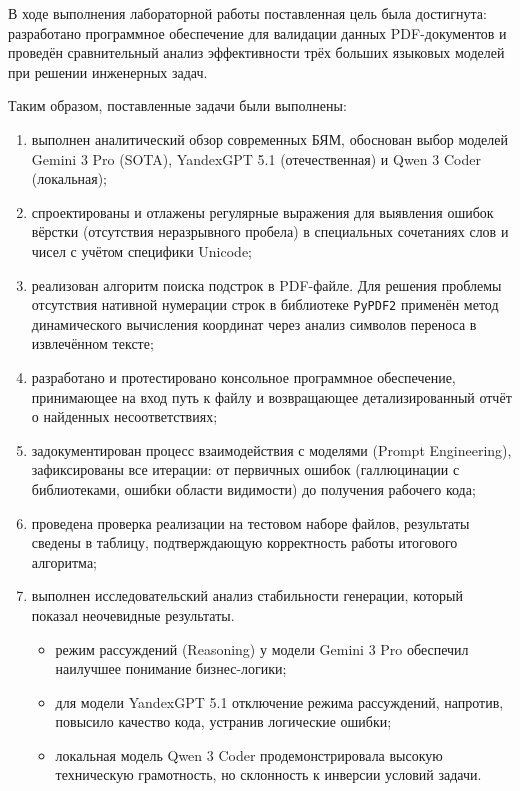 

В ходе выполнения лабораторной работы поставленная цель была достигнута: 
разработано программное обеспечение для валидации данных PDF-документов и проведён сравнительный анализ эффективности трёх больших языковых моделей при решении инженерных задач.

Таким образом, поставленные задачи были выполнены:
\begin{enumerate}
    \item выполнен аналитический обзор современных БЯМ, обоснован выбор моделей Gemini 3 Pro (SOTA), YandexGPT 5.1 (отечественная) и Qwen 3 Coder (локальная);
    \item спроектированы и отлажены регулярные выражения для выявления ошибок вёрстки (отсутствия неразрывного пробела) в специальных сочетаниях слов и чисел с учётом специфики Unicode;
    \item реализован алгоритм поиска подстрок в PDF-файле. Для решения проблемы отсутствия нативной нумерации строк в библиотеке \texttt{PyPDF2} применён метод динамического вычисления координат через анализ символов переноса в извлечённом тексте;
    \item разработано и протестировано консольное программное обеспечение, принимающее на вход путь к файлу и возвращающее детализированный отчёт о найденных несоответствиях;
    \item задокументирован процесс взаимодействия с моделями (Prompt Engineering), зафиксированы все итерации: от первичных ошибок (галлюцинации с библиотеками, ошибки области видимости) до получения рабочего кода;
    \item проведена проверка реализации на тестовом наборе файлов, результаты сведены в таблицу, подтверждающую корректность работы итогового алгоритма;
    \item выполнен исследовательский анализ стабильности генерации, который показал неочевидные результаты.
    \begin{itemize}
        \item режим рассуждений (Reasoning) у модели Gemini 3 Pro обеспечил наилучшее понимание бизнес-логики;
        \item для модели YandexGPT 5.1 отключение режима рассуждений, напротив, повысило качество кода, устранив логические ошибки;
        \item локальная модель Qwen 3 Coder продемонстрировала высокую техническую грамотность, но склонность к инверсии условий задачи.
    \end{itemize}
\end{enumerate}

\clearpage